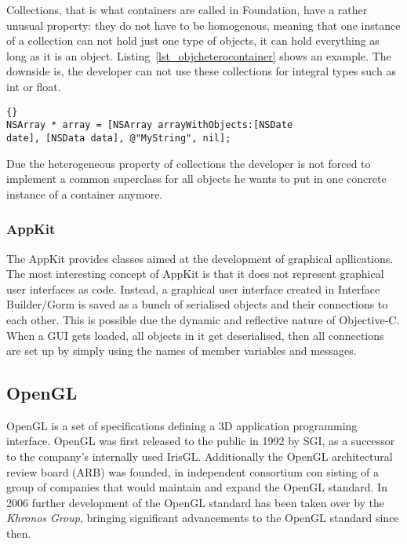 Collections, that is what containers are called in Foundation, have a rather
unusual property: they do not have to be homogenous, meaning that one instance
of a collection can not hold just one type of objects, it can hold everything
as long as it is an object. Listing~\ref{lst_objcheterocontainer} shows an
example. The downside is, the developer can not use these collections for
integral types such as int or float.

\begin{lstlisting}[captionpos=b, caption=Argument with class type information.,
label=lst_objcheterocontainer]{}
NSArray * array = [NSArray arrayWithObjects:[NSDate
date], [NSData data], @"MyString", nil];
\end{lstlisting}

Due the heterogeneous property of collections the developer is not forced to
implement a common superclass for all objects he wants to put in one concrete
instance of a container anymore.

\subsubsection{AppKit}

The AppKit provides classes aimed at the development of graphical apllications.
The most interesting concept of AppKit is that it does not represent graphical
user interfaces as code. Instead, a graphical user interface created in
Interface Builder/Gorm is saved as a bunch of serialised objects and their
connections to each other. This is possible due the dynamic and reflective
nature of Objective-C. When a GUI gets loaded, all objects in it get
deserialised, then all connections are set up by simply using the names of
member variables and messages. 

\subsection{OpenGL}
OpenGL is a set of specifications defining a 3D application programming
interface. OpenGL was first released to the public in 1992 by SGI, as a
successor to the company's internally used IrisGL. Additionally the OpenGL
architectural review board (ARB) was founded, in independent consortium con
sisting of a group of companies that would maintain and expand the OpenGL
standard. In 2006 further development of the OpenGL standard has been taken over
by the \textit{Khronos Group}, bringing significant advancements to the OpenGL
standard since then.

